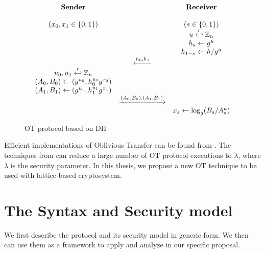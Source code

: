 \begin{figure}[h!]
  \centering
  \begin{equation*}
    \begin{array}{c c c}
      \text{\textbf{Sender}} & & \text{\textbf{Receiver}} \\
      \\
      (x_{0}, x_{1} \in \{0,1\}) & & (s \in \{0,1\}) \\
                             & & u \stackrel{r}{\hookleftarrow} \mathbb{Z}_{n}\\
                             & & h_{s} \gets g^{u}\\
                             & & h_{1-s} \gets h/g^{u}\\
                             & \xleftarrow{h_{0}, h_{1}} & \\
      u_{0}, u_{1} \stackrel{r}{\hookleftarrow} \mathbb{Z}_{n} & & \\
      (A_{0}, B_{0}) \gets (g^{u_{0}}, h_{0}^{u_{0}}g^{x_{0}}) & & \\
      (A_{1}, B_{1}) \gets (g^{u_{1}}, h_{1}^{u_{1}}g^{x_{1}}) & & \\
                             & \xrightarrow{(A_{0}, B_{0}),(A_{1}, B_{1})} & \\
      & & x_{s} \gets \log_{g}(B_{s}/A_{s}^{u})
    \end{array}
  \end{equation*}
  \caption{OT protocol based on DH}
  \label{fig:DH21OT}
\end{figure}

Efficient implementations of Oblivious Transfer can be found from \cite{naor2001efficient35}. The techniques from \cite{ishai2003extending24} can reduce a large number of OT protocol executions to \(\lambda\), where \(\lambda\) is the security parameter. In this thesis, we propose a new OT technique to be used with lattice-based cryptosystem.

\section{The Syntax and Security model}
\label{sec:syntaxModel}
We first describe the protocol and its security model in generic form.  We then can use them as a framework to apply and
analyze in our specific proposal.

